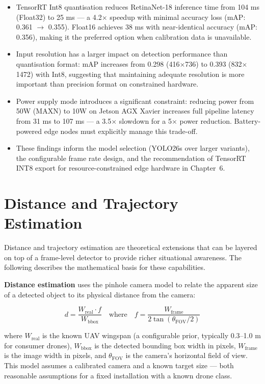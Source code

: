 \documentclass[12pt,a4paper]{report}
\begin{document}
\begin{itemize}
  \item TensorRT Int8 quantisation reduces RetinaNet-18 inference time from 104 ms (Float32)
        to 25 ms --- a 4.2$\times$ speedup with minimal accuracy loss (mAP: 0.361 $\to$ 0.355).
        Float16 achieves 38 ms with near-identical accuracy (mAP: 0.356), making it the preferred
        option when calibration data is unavailable.
  \item Input resolution has a larger impact on detection performance than quantisation format:
        mAP increases from 0.298 (416$\times$736) to 0.393 (832$\times$1472) with Int8, suggesting
        that maintaining adequate resolution is more important than precision format on constrained hardware.
  \item Power supply mode introduces a significant constraint: reducing power from 50W (MAXN) to 10W
        on Jetson AGX Xavier increases full pipeline latency from 31 ms to 107 ms --- a 3.5$\times$
        slowdown for a 5$\times$ power reduction. Battery-powered edge nodes must explicitly manage
        this trade-off.
  \item These findings inform the model selection (YOLO26s over larger variants), the configurable
        frame rate design, and the recommendation of TensorRT INT8 export for resource-constrained
        edge hardware in Chapter~6.
\end{itemize}

\section{Distance and Trajectory Estimation}

Distance and trajectory estimation are theoretical extensions that can be layered
on top of a frame-level detector to provide richer situational awareness. The
following describes the mathematical basis for these capabilities.

\textbf{Distance estimation} uses the pinhole camera model to relate the apparent
size of a detected object to its physical distance from the camera:

\begin{equation}
d = \frac{W_{\text{real}} \cdot f}{W_{\text{bbox}}}
\quad \text{where} \quad
f = \frac{W_{\text{frame}}}{2 \tan(\theta_{\text{FOV}}/2)}
\end{equation}

where $W_{\text{real}}$ is the known UAV wingspan (a configurable prior, typically
0.3--1.0 m for consumer drones), $W_{\text{bbox}}$ is the detected bounding box
width in pixels, $W_{\text{frame}}$ is the image width in pixels, and
$\theta_{\text{FOV}}$ is the camera's horizontal field of view. This model assumes
a calibrated camera and a known target size --- both reasonable assumptions for a
fixed installation with a known drone class.
\end{document}
